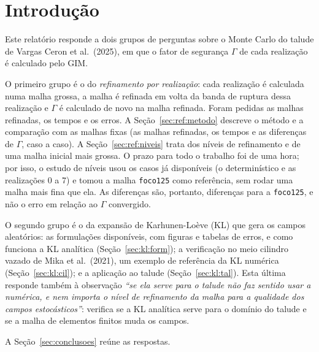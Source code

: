 \section{Introdução}\label{sec:introducao}

Este relatório responde a dois grupos de perguntas sobre o Monte Carlo do talude de Vargas Ceron et al.\ (2025), em que
o fator de segurança $\Gamma$ de cada realização é calculado pelo GIM.

O primeiro grupo é o do \emph{refinamento por realização}: cada realização é calculada numa malha grossa, a malha é
refinada em volta da banda de ruptura dessa realização e $\Gamma$ é calculado de novo na malha refinada. Foram pedidas
as malhas refinadas, os tempos e os erros. A Seção~\ref{sec:ref:metodo} descreve o método e a comparação com as malhas
fixas (as malhas refinadas, os tempos e as diferenças de $\Gamma$, caso a caso). A Seção~\ref{sec:ref:niveis} trata dos
níveis de refinamento e de uma malha inicial mais grossa. O prazo para todo o trabalho foi de uma hora; por isso, o estudo
de níveis usou os casos já disponíveis (o determinístico e as realizações 0 a 7) e tomou a malha \texttt{foco125} como
referência, sem rodar uma malha mais fina que ela. As diferenças são, portanto, diferenças para a \texttt{foco125}, e não
o erro em relação ao $\Gamma$ convergido.

O segundo grupo é o da expansão de Karhunen-Loève (KL) que gera os campos aleatórios: as formulações disponíveis, com
figuras e tabelas de erros, e como funciona a KL analítica (Seção~\ref{sec:kl:form}); a verificação no meio cilindro
vazado de Mika et al.\ (2021), um exemplo de referência da KL numérica (Seção~\ref{sec:kl:cil}); e a aplicação ao talude (Seção~\ref{sec:kl:tal}). Esta última responde também à
observação \emph{``se ela serve para o talude não faz sentido usar a numérica, e nem importa o nível de refinamento da
malha para a qualidade dos campos estocásticos''}: verifica se a KL analítica serve para o domínio do talude e se a
malha de elementos finitos muda os campos.

A Seção~\ref{sec:conclusoes} reúne as respostas.
